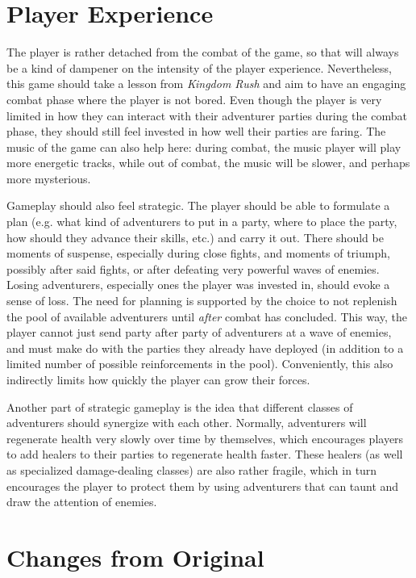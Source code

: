 \documentclass[10pt]{article}
\begin{document}
\section{Player Experience}

The player is rather detached from the combat of the game, so that will always be a kind of dampener on the intensity of the player experience.
Nevertheless, this game should take a lesson from \textit{Kingdom Rush} and aim to have an engaging combat phase where the player is not bored.
Even though the player is very limited in how they can interact with their adventurer parties during the combat phase, they should still feel invested
in how well their parties are faring. The music of the game can also help here: during combat, the music player will play more energetic tracks,
while out of combat, the music will be slower, and perhaps more mysterious.

Gameplay should also feel strategic. The player should be able to formulate a plan (e.g. what kind of adventurers to put in a party, where to place the party,
how should they advance their skills, etc.) and carry it out. There should be moments of suspense, especially during close fights, and moments of triumph,
possibly after said fights, or after defeating very powerful waves of enemies. Losing adventurers, especially ones the player was invested in,
should evoke a sense of loss. The need for planning is supported by the choice to not replenish the pool of available adventurers until \textit{after}
combat has concluded. This way, the player cannot just send party after party of adventurers at a wave of enemies, and must make do with the
parties they already have deployed (in addition to a limited number of possible reinforcements in the pool). Conveniently, this
also indirectly limits how quickly the player can grow their forces.

Another part of strategic gameplay is the idea that different classes of adventurers should synergize with each other. Normally, adventurers
will regenerate health very slowly over time by themselves, which encourages players to add healers to their parties to regenerate health faster.
These healers (as well as specialized damage-dealing classes) are also rather fragile, which in turn encourages the player to protect them
by using adventurers that can taunt and draw the attention of enemies.

\section{Changes from Original}
\end{document}
